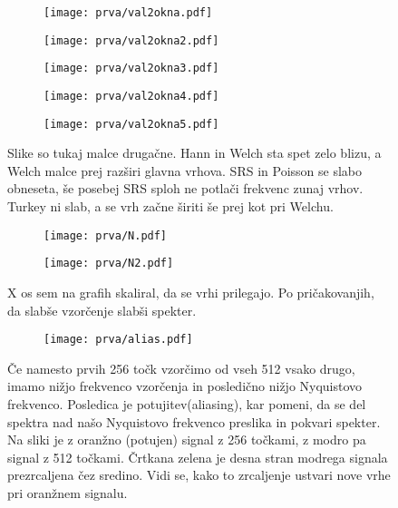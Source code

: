 \documentclass{article}
\begin{document}
\begin{figure}[H]
\centering
\begin{subfigure}{.3\textwidth}
\texttt{[image: prva/val2okna.pdf]}
\end{subfigure}
\begin{subfigure}{.3\textwidth}
\texttt{[image: prva/val2okna2.pdf]}
\end{subfigure}
\begin{subfigure}{.3\textwidth}
\texttt{[image: prva/val2okna3.pdf]}
\end{subfigure}
\end{figure}
\begin{figure}[H]
\centering
\begin{subfigure}{.3\textwidth}
\texttt{[image: prva/val2okna4.pdf]}
\end{subfigure}
\begin{subfigure}{.3\textwidth}
\texttt{[image: prva/val2okna5.pdf]}
\end{subfigure}
\caption*{Slike so tukaj malce drugačne. Hann in Welch sta spet zelo blizu, a Welch malce prej razširi glavna vrhova. SRS in Poisson se slabo obneseta, še posebej SRS sploh ne potlači frekvenc zunaj vrhov. Turkey ni slab, a se vrh začne širiti še prej kot pri Welchu. }
\end{figure}

\begin{figure}[H]
\centering
\begin{subfigure}{.49\textwidth}
\texttt{[image: prva/N.pdf]}
\end{subfigure}
\begin{subfigure}{.49\textwidth}
\texttt{[image: prva/N2.pdf]}
\end{subfigure}
\caption*{X os sem na grafih skaliral, da se vrhi prilegajo. Po pričakovanjih, da slabše vzorčenje slabši spekter.}
\end{figure}

\begin{figure}[H]
\centering
\begin{subfigure}{.49\textwidth}
\texttt{[image: prva/alias.pdf]}
\end{subfigure}
\caption*{Če namesto prvih 256 točk vzorčimo od vseh 512 vsako drugo, imamo nižjo frekvenco vzorčenja in posledično nižjo Nyquistovo frekvenco. Posledica je potujitev(aliasing), kar pomeni, da se del spektra nad našo Nyquistovo frekvenco preslika in pokvari spekter. Na sliki je z oranžno (potujen) signal z 256 točkami, z modro pa signal z 512 točkami. Črtkana zelena je desna stran modrega signala prezrcaljena čez sredino. Vidi se, kako to zrcaljenje ustvari nove vrhe pri oranžnem signalu.}
\end{figure}
\newpage
\end{document}
